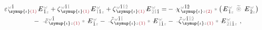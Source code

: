 \begin{subequations}
\begin{align}
	\varepsilon^{\;\! \mathcolor{gray}{\omega} \hat{1}}_{\;\! \symup{\iota} \textcolor{Maroon}{(1)}} \Xint{\mathcolor{gray}{-}}{295}{E}^{\;\!\mathcolor{gray}{\omega}}_{\;\! \hat{1} \mathcolor{gray}{z}} + \zeta^{\;\! \mathcolor{gray}{\omega} \hat{1} \mathcolor{gray}{\check{1}}}_{\;\! \symup{\iota} \textcolor{Maroon}{(1)}} \Xint{\mathcolor{gray}{-}}{295}{E}^{\;\!\mathcolor{gray}{\omega}}_{\;\! \mathcolor{gray}{\check{1}} \hat{1} \mathcolor{gray}{z}} + \zeta^{\;\! \mathcolor{gray}{\omega} \hat{1} \mathcolor{gray}{\check{1} \check{2}}}_{\;\! \symup{\iota} \textcolor{Maroon}{(1)}} \Xint{\mathcolor{gray}{-}}{295}{E}^{\;\!\mathcolor{gray}{\omega}}_{\;\! \mathcolor{gray}{\check{2} \check{1}} \hat{1}}
	= &- \Xint{{}^{}_{\mathcolor{gray}{-}}}{23}{\chi}^{\;\! \mathcolor{gray}{\omega} \hat{1} \hat{2}}_{\;\! \symup{\iota} \mathcolor{gray}{z} \textcolor{Maroon}{(2)}} \mathcolor{gray}{*} \left( \Xint{\mathcolor{gray}{-}}{295}{E}^{\;\!\mathcolor{gray}{\omega}}_{\;\! \hat{1} \mathcolor{gray}{z}} ~\mathcolor{gray}{\widetilde \circledast}~ \Xint{\mathcolor{gray}{-}}{295}{E}^{\;\!\mathcolor{gray}{\omega}}_{\;\! \hat{2} \mathcolor{gray}{z}} \right) \label{eq:nonlinear(2)-wave_wkrho-simplify4} \\
	-~ \Xint{\begin{smallmatrix} ~ \\ {}^{}_{\mathcolor{gray}{-}} \\ ~ \end{smallmatrix}}{16}{\tilde{\varepsilon}}^{\;\! \mathcolor{gray}{\omega} \hat{1}}_{\;\! \symup{\iota} \mathcolor{gray}{z} \textcolor{Maroon}{(1)}} \mathcolor{gray}{*} \Xint{\mathcolor{gray}{-}}{295}{E}^{\;\!\mathcolor{gray}{\omega}}_{\;\! \hat{1} \mathcolor{gray}{z}}
	- \Xint{\begin{smallmatrix} ~ \\ {}^{}_{\mathcolor{gray}{-}} \\ ~ \end{smallmatrix}}{12}{\tilde{\zeta}}^{\;\! \mathcolor{gray}{\omega} \hat{1} \mathcolor{gray}{\check{1}}}_{\;\! \symup{\iota} \mathcolor{gray}{z} \textcolor{Maroon}{(1)}} \mathcolor{gray}{*} \Xint{\mathcolor{gray}{-}}{295}{E}^{\;\!\mathcolor{gray}{\omega}}_{\;\! \mathcolor{gray}{\check{1}} \hat{1} \mathcolor{gray}{z}} &- \Xint{\begin{smallmatrix} ~ \\ {}^{}_{\mathcolor{gray}{-}} \\ ~ \end{smallmatrix}}{12}{\tilde{\zeta}}^{\;\! \mathcolor{gray}{\omega} \hat{1} \mathcolor{gray}{\check{1} \check{2}}}_{\;\! \symup{\iota} \mathcolor{gray}{z} \textcolor{Maroon}{(1)}} \mathcolor{gray}{*} \Xint{\mathcolor{gray}{-}}{295}{E}^{\;\!\mathcolor{gray}{\omega}}_{\;\! \mathcolor{gray}{\check{2} \check{1}} \hat{1} \mathcolor{gray}{z}} ~, \label{eq:nonlinear(2)-wave_wkrho-simplify4-2}
\end{align}
\end{subequations}
